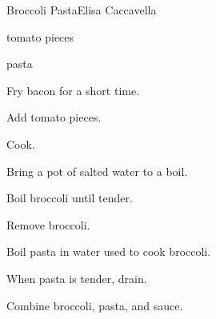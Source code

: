 \begin{recipe}{Broccoli Pasta}{Elisa Caccavella}{}

\begin{ingredients}
\item {}
\item tomato pieces
\item {}
\item pasta
\end{ingredients}

\begin{directions}
\item Fry bacon for a short time.
\item Add tomato pieces.
\item Cook.
\item Bring a pot of salted water to a boil.
\item Boil broccoli until tender.
\item Remove broccoli.
\item Boil pasta in water used to cook broccoli.
\item When pasta is tender, drain.
\item Combine broccoli, pasta, and sauce.
\end{directions}

\end{recipe}
